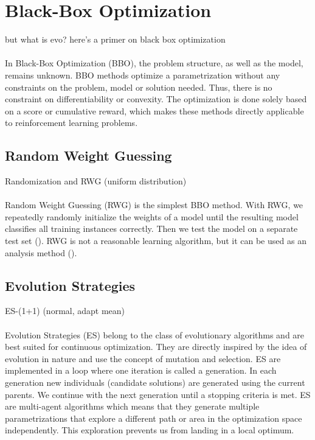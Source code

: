 
\section{Black-Box Optimization}
but what is evo? here's a primer on black box optimization \\ \\
In Black-Box Optimization (BBO), the problem structure, as well as the model, remains unknown. BBO methods optimize a parametrization without any constraints on the problem, model or solution needed. Thus, there is no constraint on differentiability or convexity. The optimization is done solely based on a score or cumulative reward, which makes these methods directly applicable to reinforcement learning problems.

\subsection{Random Weight Guessing}
Randomization and RWG (uniform distribution) \\ \\
Random Weight Guessing (RWG) is the simplest BBO method. With RWG, we repeatedly randomly initialize the weights of a model until the resulting model classifies all training instances correctly. Then we test the model on a separate test set (\cite{schmidhuber2001evaluating}). RWG is not a reasonable learning algorithm, but it can be used as an analysis method (\cite{oller_analyzing_2020}).

\subsection{Evolution Strategies}
ES-(1+1) (normal, adapt mean) \\ \\
Evolution Strategies (ES) belong to the class of evolutionary algorithms and are best suited for continuous optimization. They are directly inspired by the idea of evolution in nature and use the concept of mutation and selection. ES are implemented in a loop where one iteration is called a generation. In each generation new individuals (candidate solutions) are generated using the current parents. We continue with the next generation until a stopping criteria is met. ES are multi-agent algorithms which means that they generate multiple parametrizations that explore a different path or area in the optimization space independently. This exploration prevents us from landing in a local optimum.

